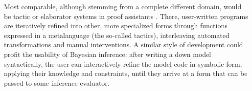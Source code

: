 Most comparable, although stemming from a complete different domain, would be tactic or elaborator
systems in proof assistants \parencite[e.g.,][]{brady2013idris,coqdevelopmentteam2010coq}.  There,
user-written programs are iteratively refined into other, more specialized forms through functions
expressed in a metalanguage (the so-called tactics), interleaving automated transformations and
manual interventions.  A similar style of development could profit the usability of Bayesian
inference: after writing a down model syntactically, the user can interactively refine the model
code in symbolic form, applying their knowledge and constraints, until they arrive at a form that
can be passed to some inference evaluator.

